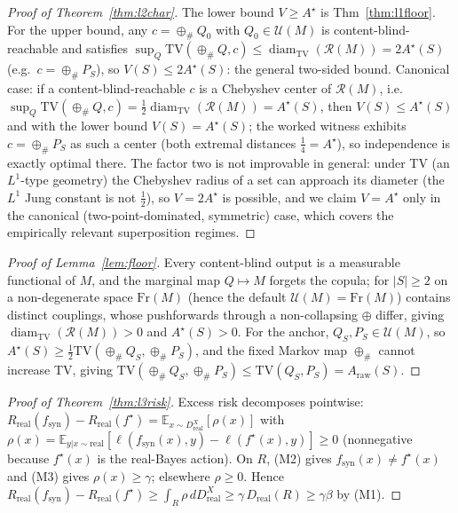 \documentclass[11pt]{article}
\begin{document}
\begin{proof}[Proof of Theorem~\ref{thm:l2char}]
The lower bound $V\ge A^\star$ is Thm~\ref{thm:l1floor}. For the upper bound, any
$c=\oplus_{\#}Q_0$ with $Q_0\in\mathcal U(M)$ is content-blind-reachable and satisfies
$\sup_{Q}\mathrm{TV}(\oplus_{\#}Q,c)\le\operatorname{diam}_{\mathrm{TV}}(\mathcal R(M))=2A^\star(S)$
(e.g.\ $c=\oplus_{\#}P_S$), so $V(S)\le2A^\star(S)$: the general two-sided bound. Canonical case:
if a content-blind-reachable $c$ is a Chebyshev center of $\mathcal R(M)$, i.e.\
$\sup_Q\mathrm{TV}(\oplus_{\#}Q,c)=\tfrac12\operatorname{diam}_{\mathrm{TV}}(\mathcal R(M))=A^\star(S)$,
then $V(S)\le A^\star(S)$ and with the lower bound $V(S)=A^\star(S)$; the worked witness exhibits
$c=\oplus_{\#}P_S$ as such a center (both extremal distances $\tfrac14=A^\star$), so independence is
exactly optimal there. The factor two is not improvable in general: under TV (an $L^1$-type
geometry) the Chebyshev radius of a set can approach its diameter (the $L^1$ Jung constant is not
$\tfrac12$), so $V=2A^\star$ is possible, and we claim $V=A^\star$ only in the canonical
(two-point-dominated, symmetric) case, which covers the empirically relevant superposition regimes.
\end{proof}

\begin{proof}[Proof of Lemma~\ref{lem:floor}]
Every content-blind output is a measurable functional of $M$, and the marginal map $Q\mapsto M$
forgets the copula; for $|S|\ge2$ on a non-degenerate space $\mathrm{Fr}(M)$ (hence the default
$\mathcal U(M)=\mathrm{Fr}(M)$) contains distinct couplings, whose pushforwards through a
non-collapsing $\oplus$ differ, giving $\operatorname{diam}_{\mathrm{TV}}(\mathcal R(M))>0$ and
$A^\star(S)>0$. For the anchor, $Q_S,P_S\in\mathcal U(M)$, so
$A^\star(S)\ge\tfrac12\mathrm{TV}(\oplus_{\#}Q_S,\oplus_{\#}P_S)$, and the fixed Markov map
$\oplus_{\#}$ cannot increase TV, giving
$\mathrm{TV}(\oplus_{\#}Q_S,\oplus_{\#}P_S)\le\mathrm{TV}(Q_S,P_S)=A_{\mathrm{raw}}(S)$.
\end{proof}

\begin{proof}[Proof of Theorem~\ref{thm:l3risk}]
Excess risk decomposes pointwise:
$R_{\mathrm{real}}(f_{\mathrm{syn}})-R_{\mathrm{real}}(f^\star)=\mathbb{E}_{x\sim D_{\mathrm{real}}^X}[\rho(x)]$
with $\rho(x)=\mathbb{E}_{y|x\sim\mathrm{real}}[\ell(f_{\mathrm{syn}}(x),y)-\ell(f^\star(x),y)]\ge0$
(nonnegative because $f^\star(x)$ is the real-Bayes action). On $R$, (M2) gives
$f_{\mathrm{syn}}(x)\ne f^\star(x)$ and (M3) gives $\rho(x)\ge\gamma$; elsewhere $\rho\ge0$. Hence
$R_{\mathrm{real}}(f_{\mathrm{syn}})-R_{\mathrm{real}}(f^\star)\ge\int_R\rho\,dD_{\mathrm{real}}^X\ge\gamma\,D_{\mathrm{real}}(R)\ge\gamma\beta$
by (M1).
\end{proof}
\end{document}
